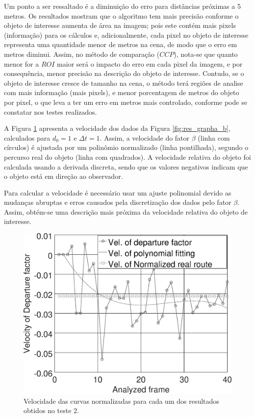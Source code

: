 Um ponto a ser ressaltado é a diminuição do erro para distâncias próximas a 5 metros.  
Os resultados mostram que o algoritmo tem mais precisão conforme o objeto de interesse 
aumenta de área na imagem; pois este contém mais pixels (informação)
para os cálculos e, adicionalmente, cada pixel no objeto de interesse 
representa uma quantidade menor de metros na cena, de modo que
o erro em metros diminui.
Assim, no método de comparação ($CCP$), nota-se que quanto menor for a $ROI$ 
maior será o impacto do erro em cada pixel da imagem, 
e por consequência, menor precisão na descrição do objeto de interesse. 
Contudo, se o objeto de interesse cresce de tamanho na cena,
o método terá regiões de analise com mais informação (mais pixels), e menor porcentagem de metros do objeto por pixel,
o que leva a ter um erro em metros mais controlado, conforme pode se constatar nos testes realizados. 

A Figura \ref{fig:res_grapha_bv} apresenta a velocidade dos dados da 
Figura \ref{fig:res_grapha_b}, calculados para $d_0=1$ e $\Delta t=1$.
Assim, a velocidade do fator $\beta$ (linha com círculos) é ajustada por um polinômio
normalizado (linha pontilhada), segundo o percurso real do objeto (linha com quadrados).
A velocidade relativa do objeto foi calculada usando a derivada
discreta, sendo que os valores negativos indicam que o objeto está
em direção ao observador.

Para calcular a velocidade é necessário usar um ajuste polinomial devido 
as mudanças abruptas e erros causados pela discretização dos dados pelo fator $\beta$.
Assim, obtém-se uma descrição mais próxima da velocidade relativa do 
objeto de interesse.

\begin{figure}[h]
\includegraphics[width=\columnwidth]{images/graphvelocity.eps}
\caption{Velocidade das curvas normalizadas para cada um dos resultados obtidos no teste 2.}
\label{fig:res_grapha_bv}
\end{figure}
